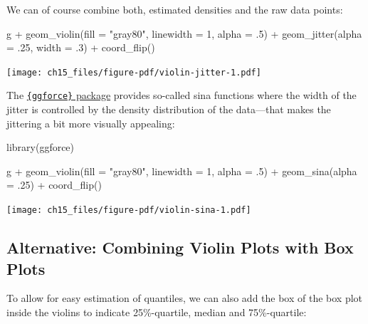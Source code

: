 \documentclass[
  letterpaper,
  DIV=11,
  numbers=noendperiod]{scrreprt}
\newenvironment{Shaded}{\begin{snugshade}}{\end{snugshade}}
\newcommand{\AttributeTok}[1]{\textcolor[rgb]{0.40,0.45,0.13}{#1}}
\newcommand{\DecValTok}[1]{\textcolor[rgb]{0.68,0.00,0.00}{#1}}
\newcommand{\FunctionTok}[1]{\textcolor[rgb]{0.28,0.35,0.67}{#1}}
\newcommand{\NormalTok}[1]{\textcolor[rgb]{0.00,0.23,0.31}{#1}}
\newcommand{\SpecialCharTok}[1]{\textcolor[rgb]{0.37,0.37,0.37}{#1}}
\newcommand{\StringTok}[1]{\textcolor[rgb]{0.13,0.47,0.30}{#1}}
\begin{document}
We can of course combine both, estimated densities and the raw data
points:

\begin{Shaded}
\begin{Highlighting}[]
\NormalTok{g }\SpecialCharTok{+} \FunctionTok{geom\_violin}\NormalTok{(}\AttributeTok{fill =} \StringTok{"gray80"}\NormalTok{, }\AttributeTok{linewidth =} \DecValTok{1}\NormalTok{, }\AttributeTok{alpha =}\NormalTok{ .}\DecValTok{5}\NormalTok{) }\SpecialCharTok{+}
    \FunctionTok{geom\_jitter}\NormalTok{(}\AttributeTok{alpha =}\NormalTok{ .}\DecValTok{25}\NormalTok{, }\AttributeTok{width =}\NormalTok{ .}\DecValTok{3}\NormalTok{) }\SpecialCharTok{+}
    \FunctionTok{coord\_flip}\NormalTok{()}
\end{Highlighting}
\end{Shaded}

\texttt{[image: ch15\_files/figure-pdf/violin-jitter-1.pdf]}

The \href{https://ggforce.data-imaginist.com/}{\texttt{\{ggforce\}}
package} provides so-called sina functions where the width of the jitter
is controlled by the density distribution of the data---that makes the
jittering a bit more visually appealing:

\begin{Shaded}
\begin{Highlighting}[]
\FunctionTok{library}\NormalTok{(ggforce)}

\NormalTok{g }\SpecialCharTok{+} \FunctionTok{geom\_violin}\NormalTok{(}\AttributeTok{fill =} \StringTok{"gray80"}\NormalTok{, }\AttributeTok{linewidth =} \DecValTok{1}\NormalTok{, }\AttributeTok{alpha =}\NormalTok{ .}\DecValTok{5}\NormalTok{) }\SpecialCharTok{+}
    \FunctionTok{geom\_sina}\NormalTok{(}\AttributeTok{alpha =}\NormalTok{ .}\DecValTok{25}\NormalTok{) }\SpecialCharTok{+}
    \FunctionTok{coord\_flip}\NormalTok{()}
\end{Highlighting}
\end{Shaded}

\texttt{[image: ch15\_files/figure-pdf/violin-sina-1.pdf]}

\subsection{Alternative: Combining Violin Plots with Box
Plots}\label{alternative-combining-violin-plots-with-box-plots}

To allow for easy estimation of quantiles, we can also add the box of
the box plot inside the violins to indicate 25\%-quartile, median and
75\%-quartile:
\end{document}
